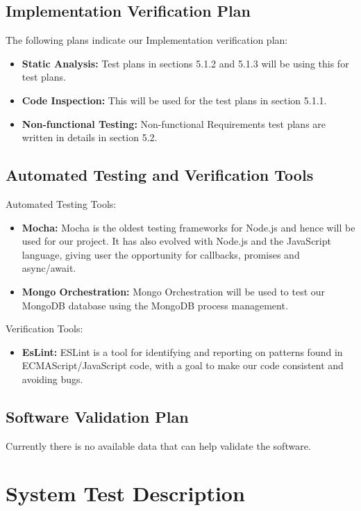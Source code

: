 \documentclass[12pt, titlepage]{article}
\begin{document}
\subsection{Implementation Verification Plan}
The following plans indicate our Implementation verification plan:
\begin{itemize}
    \item \textbf{Static Analysis:} Test plans in sections 5.1.2 and 5.1.3 will be using this for test plans.
    \item \textbf{Code Inspection:} This will be used for the test plans in section 5.1.1.
    \item \textbf{Non-functional Testing:} Non-functional Requirements test plans are written in details in section 5.2.
\end{itemize}

\subsection{Automated Testing and Verification Tools}
Automated Testing Tools:
\begin{itemize}
    \item \textbf{Mocha:} Mocha is the oldest testing frameworks for Node.js and hence will be used for our project. It has also evolved with Node.js and the JavaScript language, giving user the opportunity for callbacks, promises and async/await. 
    \item \textbf{Mongo Orchestration:} Mongo Orchestration will be used to test our MongoDB database using the MongoDB process management.
\end{itemize}
Verification Tools:
\begin{itemize}
    \item \textbf{EsLint:} ESLint is a tool for identifying and reporting on patterns found in ECMAScript/JavaScript code, with a goal to make our code consistent and avoiding bugs.
\end{itemize}

\subsection{Software Validation Plan}

Currently there is no available data that can help validate the software.




\section{System Test Description}
	
\end{document}
